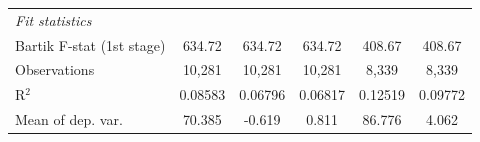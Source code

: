 \begin{tabular}{lccccc}
   \midrule
   \emph{Fit statistics}\\
   Bartik F-stat (1st stage)                                     & 634.72                      & 634.72         & 634.72                                  & 408.67                      & 408.67\\  
   Observations                                                          & 10,281                      & 10,281         & 10,281                                  & 8,339                       & 8,339\\  
   R$^2$                                                                 & 0.08583                     & 0.06796        & 0.06817                                 & 0.12519                     & 0.09772\\  
   Mean of dep. var.                                                     & 70.385                      & -0.619         & 0.811                                   & 86.776                      & 4.062\\  
\bottomrule
\end{tabular}
